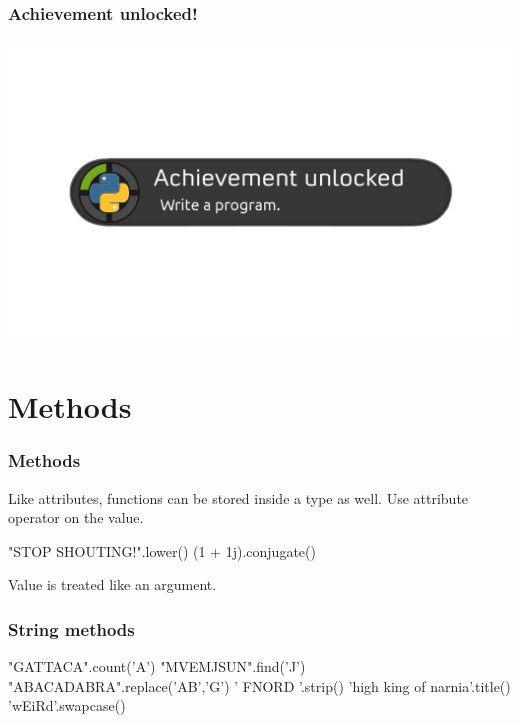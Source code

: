 \documentclass[11pt]{beamer}
\begin{document}
\begin{frame}
  \frametitle{Achievement unlocked!}
  \includegraphics[width=\textwidth]{./img/achievement_unlocked-functions.png}
\end{frame}

\section{Methods}

\begin{frame}[fragile]
  \frametitle{Methods}
  \Enlarge

  \begin{itemize}
  \myitem  Like attributes, functions can be stored inside a type as well. \pause
  \myitem  Use attribute operator on the value. \pause
    \begin{semiverbatim}
"STOP SHOUTING!".lower()
(1 + 1j).conjugate()
    \end{semiverbatim} \pause
  \myitem  Value is treated like an argument.
  \end{itemize}
\end{frame}

\begin{frame}[fragile]
  \frametitle{String methods}
  \Enlarge

  \begin{semiverbatim}
"GATTACA".count('A')
"MVEMJSUN".find('J')
"ABACADABRA".replace('AB','G')
' FNORD '.strip()
'high king of narnia'.title()
'wEiRd'.swapcase()
  \end{semiverbatim}
\end{frame}
\end{document}
